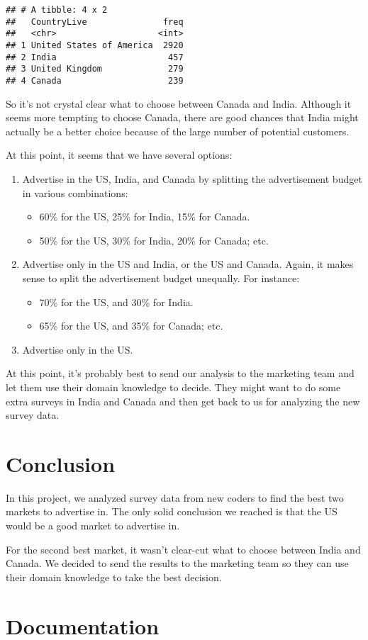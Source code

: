 \documentclass[
]{article}
\providecommand{\tightlist}{%
  \setlength{\itemsep}{0pt}\setlength{\parskip}{0pt}}
\begin{document}
\begin{verbatim}
## # A tibble: 4 x 2
##   CountryLive               freq
##   <chr>                    <int>
## 1 United States of America  2920
## 2 India                      457
## 3 United Kingdom             279
## 4 Canada                     239
\end{verbatim}

So it's not crystal clear what to choose between Canada and India.
Although it seems more tempting to choose Canada, there are good chances
that India might actually be a better choice because of the large number
of potential customers.

At this point, it seems that we have several options:

\begin{enumerate}
\def\labelenumi{\arabic{enumi}.}
\tightlist
\item
  Advertise in the US, India, and Canada by splitting the advertisement
  budget in various combinations:

  \begin{itemize}
  \tightlist
  \item
    60\% for the US, 25\% for India, 15\% for Canada.
  \item
    50\% for the US, 30\% for India, 20\% for Canada; etc.
  \end{itemize}
\item
  Advertise only in the US and India, or the US and Canada. Again, it
  makes sense to split the advertisement budget unequally. For instance:

  \begin{itemize}
  \tightlist
  \item
    70\% for the US, and 30\% for India.
  \item
    65\% for the US, and 35\% for Canada; etc.
  \end{itemize}
\item
  Advertise only in the US.
\end{enumerate}

At this point, it's probably best to send our analysis to the marketing
team and let them use their domain knowledge to decide. They might want
to do some extra surveys in India and Canada and then get back to us for
analyzing the new survey data.

\hypertarget{conclusion}{%
\section{Conclusion}\label{conclusion}}

In this project, we analyzed survey data from new coders to find the
best two markets to advertise in. The only solid conclusion we reached
is that the US would be a good market to advertise in.

For the second best market, it wasn't clear-cut what to choose between
India and Canada. We decided to send the results to the marketing team
so they can use their domain knowledge to take the best decision.

\hypertarget{documentation}{%
\section{Documentation}\label{documentation}}
\end{document}
